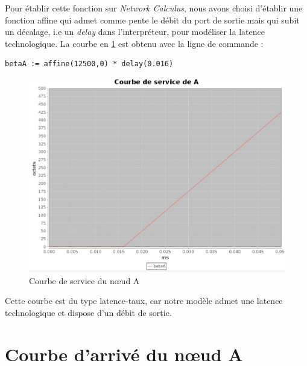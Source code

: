Pour établir cette fonction sur \emph{Network Calculus}, nous avons choisi d'établir une fonction affine qui admet comme pente le débit du port de sortie mais qui subit un décalage, i.e un \emph{delay} dans l'interpréteur, pour modéliser la latence technologique. La courbe en \ref{fig:serviceA} est obtenu avec la ligne de commande :
\begin{verbatim}
betaA := affine(12500,0) * delay(0.016) 
\end{verbatim}
\begin{figure}[!ht]\label{fig:serviceA}
\centering
\includegraphics[width = .5\textwidth]{./I/images/beta_A.png}
\caption{Courbe de service du nœud A}
\end{figure} 

Cette courbe est du type latence-taux, car notre modèle admet une latence technologique et dispose d'un débit de sortie.  

\section{Courbe d'arrivé du nœud A}
